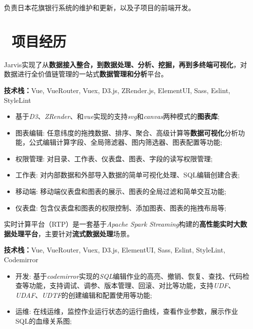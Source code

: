 \documentclass{resume}
\begin{document}
\begin{onehalfspacing}
负责日本花旗银行系统的维护和更新，以及子项目的前端开发。
\end{onehalfspacing}

\section{\faUsers\ 项目经历}

\begin{onehalfspacing}
Jarvis实现了从\textbf{数据接入整合，到数据处理、分析、挖掘，再到多终端可视化}，对数据进行全价值链管理的一站式\textbf{数据管理和分析}平台。


\textbf{技术栈：}Vue, VueRouter, Vuex, D3.js, ZRender.js, ElementUI, Sass, Eslint, StyleLint
\begin{itemize}
  \item 基于\textit{D3}、\textit{ZRender}、和\textit{vue}实现的支持\textit{svg}和\textit{canvas}两种模式的\textbf{图表库};
  \item 图表编辑: 任意纬度的拖拽数据、排序、聚合、高级计算等\textbf{数据可视化}分析功能，公式编辑计算字段、全局筛滤器、图内筛选器、图表配置等功能;
  \item 权限管理: 对目录、工作表、仪表盘、图表、字段的读写权限管理;
  \item 工作表: 对内部数据和外部导入数据的简单可视化处理、SQL编辑创建合表;
  \item 移动端: 移动端仪表盘和图表的展示、图表的全局过滤和简单交互功能;
  \item 仪表盘: 包含仪表盘和图表的权限控制、添加图表、图表的拖拽布局等;
\end{itemize}
\end{onehalfspacing}

\begin{onehalfspacing}
实时计算平台（RTP）是一套基于\textit{Apache Spark Streaming}构建的\textbf{高性能实时大数据处理平台}，主要针对\textbf{流式数据处理}场景。


\textbf{技术栈：}Vue, VueRouter, Vuex, D3.js, ElementUI, Sass, Eslint, StyleLint, Codemirror
\begin{itemize}
  \item 开发: 基于\textit{codemirror}实现的\textit{SQL}编辑作业的高亮、撤销、恢复、查找、代码检查等功能，支持调试、调参、版本管理、回滚、对比等功能，支持\textit{UDF}、\textit{UDAF}、\textit{UDTF}的创建编辑和配置使用等功能;
  \item 运维: 在线运维，监控作业运行状态的运行曲线，查看作业参数，展示作业SQL的血缘关系图;
\end{itemize}
\end{onehalfspacing}
\end{document}
